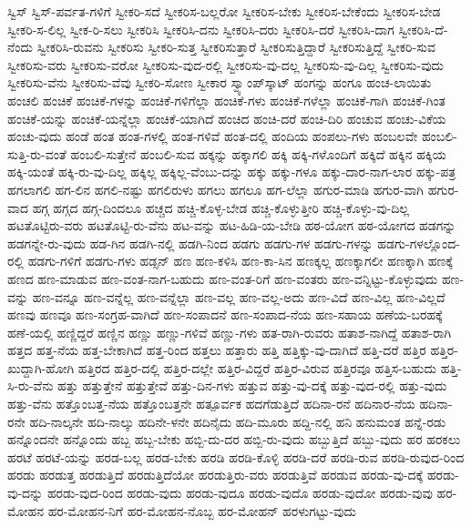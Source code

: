 {ಸ್ವಿಸ್
ಸ್ವಿಸ್‌-ಪರ್ವತ-ಗಳಿಗೆ
ಸ್ವೀಕರಿ-ಸದೆ
ಸ್ವೀಕರಿಸ-ಬಲ್ಲರೋ
ಸ್ವೀಕರಿಸ-ಬೇಕು
ಸ್ವೀಕರಿಸ-ಬೇಕೆಂದು
ಸ್ವೀಕರಿಸ-ಬೇಡ
ಸ್ವೀಕರಿ-ಸ-ಲಿಲ್ಲ
ಸ್ವೀಕ-ರಿ-ಸಲು
ಸ್ವೀಕರಿಸಿ
ಸ್ವೀಕರಿಸಿ-ದನು
ಸ್ವೀಕರಿಸಿ-ದರು
ಸ್ವೀಕರಿಸಿ-ದರೆ
ಸ್ವೀಕರಿಸಿ-ದಾಗ
ಸ್ವೀಕರಿಸಿ-ದೆ-ನೆಂದು
ಸ್ವೀಕರಿಸಿ-ರುವನು
ಸ್ವೀಕರಿಸು
ಸ್ವೀಕರಿ-ಸುತ್ತ
ಸ್ವೀಕರಿಸುತ್ತಾರೆ
ಸ್ವೀಕರಿಸುತ್ತಿದ್ದಾರೆ
ಸ್ವೀಕರಿಸುತ್ತಿದ್ದೆ
ಸ್ವೀಕರಿ-ಸುವ
ಸ್ವೀಕರಿಸು-ವರು
ಸ್ವೀಕರಿಸು-ವರೋ
ಸ್ವೀಕರಿಸು-ವುದ-ರಲ್ಲಿ
ಸ್ವೀಕರಿಸು-ವು-ದಲ್ಲ
ಸ್ವೀಕರಿಸು-ವು-ದಿಲ್ಲ
ಸ್ವೀಕರಿಸು-ವುದು
ಸ್ವೀಕರಿಸು-ವೆನು
ಸ್ವೀಕರಿಸು-ವೆವು
ಸ್ವೀಕರಿ-ಸೋಣ
ಸ್ವೀಕಾರ
ಸ್ವ್ಯಾಂಪ್‌ಸ್ಕಾಟ್
ಹಂಗನ್ನು
ಹಂಗೂ
ಹಂಚ-ಲಾಯಿತು
ಹಂಚಲಿ
ಹಂಚಿಕೆ
ಹಂಚಿಕೆ-ಗಳನ್ನು
ಹಂಚಿಕೆ-ಗಳಿಗೆಲ್ಲಾ
ಹಂಚಿಕೆ-ಗಳು
ಹಂಚಿಕೆ-ಗಳೆಲ್ಲಾ
ಹಂಚಿಕೆ-ಗಾಗಿ
ಹಂಚಿಕೆ-ಗಿಂತ
ಹಂಚಿಕೆ-ಯನ್ನು
ಹಂಚಿಕೆ-ಯನ್ನೆಲ್ಲಾ
ಹಂಚಿಕೆ-ಯಾಗಿದೆ
ಹಂಚಿದ
ಹಂಚಿ-ದರೆ
ಹಂಚಿ-ದಿರಿ
ಹಂಚುವ
ಹಂಚು-ವಿಕೆಯ
ಹಂಚು-ವುದು
ಹಂಡೆ
ಹಂತ
ಹಂತ-ಗಳಲ್ಲಿ
ಹಂತ-ಗಳಿವೆ
ಹಂತ-ದಲ್ಲಿ
ಹಂದಿಯ
ಹಂಪಲು-ಗಳು
ಹಂಬಲವೇ
ಹಂಬಲಿ-ಸುತ್ತಿ-ರು-ವಂತೆ
ಹಂಬಲಿ-ಸುತ್ತೇನೆ
ಹಂಬಲಿ-ಸುವ
ಹಕ್ಕನ್ನು
ಹಕ್ಕಾಗಲಿ
ಹಕ್ಕಿ
ಹಕ್ಕಿ-ಗಳೊಂದಿಗೆ
ಹಕ್ಕಿದೆ
ಹಕ್ಕಿನ
ಹಕ್ಕಿಯ
ಹಕ್ಕಿ-ಯಂತೆ
ಹಕ್ಕಿ-ರು-ವು-ದಿಲ್ಲ
ಹಕ್ಕಿಲ್ಲ
ಹಕ್ಕಿಲ್ಲ-ವೆಂಬು-ದನ್ನು
ಹಕ್ಕು
ಹಕ್ಕು-ಗಳೂ
ಹಕ್ಕು-ದಾರ-ನಾಗ-ಲಾರ
ಹಕ್ಕು-ಪತ್ರ
ಹಗಲಾಗಲಿ
ಹಗ-ಲಿನ
ಹಗಲಿ-ನಷ್ಟು
ಹಗಲಿರುಳು
ಹಗಲು
ಹಗಲೂ
ಹಗ-ಲೆಲ್ಲಾ
ಹಗುರ-ಮಾಡಿ
ಹಗುರ-ವಾಗಿ
ಹಗುರ-ವಾದ
ಹಗ್ಗ
ಹಗ್ಗದ
ಹಗ್ಗ-ದಿಂದಲೂ
ಹಚ್ಚದ
ಹಚ್ಚಿ-ಕೊಳ್ಳ-ಬೇಡ
ಹಚ್ಚಿ-ಕೊಳ್ಳುತ್ತೀರಿ
ಹಚ್ಚಿ-ಕೊಳ್ಳು-ವು-ದಿಲ್ಲ
ಹಟತೊಟ್ಟಿರು-ವರು
ಹಟತೊಟ್ಟಿ-ರು-ವೆನು
ಹಟ-ವನ್ನು
ಹಟ-ಹಿಡಿ-ಯ-ಬೇಡಿ
ಹಠ-ಯೋಗ
ಹಠ-ಯೋಗದ
ಹಡಗನ್ನು
ಹಡಗನ್ನೇ-ರು-ವುದು
ಹಡ-ಗಿನ
ಹಡಗಿ-ನಲ್ಲಿ
ಹಡಗಿ-ನಿಂದ
ಹಡಗು
ಹಡಗು-ಗಳ
ಹಡಗು-ಗಳನ್ನು
ಹಡಗು-ಗಳಲ್ಲೊಂದ-ರಲ್ಲಿ
ಹಡಗು-ಗಳಿಗೆ
ಹಡಗು-ಗಳು
ಹಡ್ಸನ್
ಹಣ
ಹಣ-ಕಳಿಸಿ
ಹಣ-ಕಾ-ಸಿನ
ಹಣಕ್ಕಲ್ಲ
ಹಣಕ್ಕಾಗಲೀ
ಹಣಕ್ಕಾಗಿ
ಹಣಕ್ಕೆ
ಹಣದ
ಹಣ-ಮಾಡುವ
ಹಣ-ವಂತ-ನಾಗ-ಬಹುದು
ಹಣ-ವಂತ-ರಿಗೆ
ಹಣ-ವಂತರು
ಹಣ-ವನ್ನಿಟ್ಟು-ಕೊಳ್ಳುವುದು
ಹಣ-ವನ್ನು
ಹಣ-ವನ್ನೂ
ಹಣ-ವನ್ನೆಲ್ಲ
ಹಣ-ವನ್ನೆಲ್ಲಾ
ಹಣ-ವಲ್ಲ
ಹಣ-ವಲ್ಲ-ಅದು
ಹಣ-ವಿದೆ
ಹಣ-ವಿಲ್ಲ
ಹಣ-ವಿಲ್ಲದೆ
ಹಣವು
ಹಣವೂ
ಹಣ-ಸಂಗ್ರಹ-ವಾಗಿದೆ
ಹಣ-ಸಂಪಾದನೆ
ಹಣ-ಸಂಪಾದ-ನೆಯ
ಹಣ-ಸಹಾಯ
ಹಣೆಯ-ಬರಹಕ್ಕೆ
ಹಣೆ-ಯಲ್ಲಿ
ಹಣ್ಣಿದ್ದರೆ
ಹಣ್ಣಿನ
ಹಣ್ಣು
ಹಣ್ಣು-ಗಳಿವೆ
ಹಣ್ಣು-ಗಳು
ಹತ-ರಾಗಿ-ರುವರು
ಹತಾಶ-ನಾಗಿದ್ದೆ
ಹತಾಶ-ರಾಗಿ
ಹತ್ತದ
ಹತ್ತ-ನೆಯ
ಹತ್ತ-ಬೇಕಾಗಿದೆ
ಹತ್ತ-ರಿಂದ
ಹತ್ತಲು
ಹತ್ತಾರು
ಹತ್ತಿ
ಹತ್ತಿಕ್ಕು-ವು-ದಾಗಿದೆ
ಹತ್ತಿ-ದರೆ
ಹತ್ತಿರ
ಹತ್ತಿರ-ಖುದ್ದಾಗಿ-ಹೋಗಿ
ಹತ್ತಿರದ
ಹತ್ತಿರ-ದಲ್ಲಿ
ಹತ್ತಿರ-ದಲ್ಲೇ
ಹತ್ತಿರ-ವಿದ್ದರೆ
ಹತ್ತಿರ-ವಿರುವ
ಹತ್ತಿರವೂ
ಹತ್ತಿಸ-ಬಹುದು
ಹತ್ತಿ-ಸಿ-ರು-ವೆನು
ಹತ್ತು
ಹತ್ತುತ್ತೇನೆ
ಹತ್ತುತ್ತೇವೆ
ಹತ್ತು-ದಿನ-ಗಳು
ಹತ್ತುವ
ಹತ್ತು-ವು-ದಕ್ಕೆ
ಹತ್ತು-ವುದ-ರಲ್ಲಿ
ಹತ್ತು-ವುದು
ಹತ್ತು-ವೆನು
ಹತ್ತೊಂಬತ್ತ-ನೆಯ
ಹತ್ತೊಂಬತ್ತನೇ
ಹತ್ಪೂರ್ವಕ
ಹದಗೆಡುತ್ತಿದೆ
ಹದಿನಾ-ರನೆ
ಹದಿನಾರ-ನೆಯ
ಹದಿನಾ-ರನೇ
ಹದಿ-ನಾಲ್ಕನೇ
ಹದಿ-ನಾಲ್ಕು
ಹದಿನೇ-ಳನೇ
ಹದಿನೈದು
ಹದಿ-ಮೂರು
ಹದ್ದಿ-ನಲ್ಲಿ
ಹನಿ
ಹನುಮಂತ
ಹನ್ನೆ-ರಡು
ಹನ್ನೊಂದನೇ
ಹನ್ನೊಂದು
ಹಬ್ಬ
ಹಬ್ಬ-ಬೇಕು
ಹಬ್ಬಿ-ದು-ದರ
ಹಬ್ಬಿ-ರು-ವುದು
ಹಬ್ಬುತ್ತಿದೆ
ಹಬ್ಬು-ವುದು
ಹರ
ಹರಕಲು
ಹರಟೆ
ಹರಟೆ-ಯನ್ನು
ಹರಡ-ಬಲ್ಲ
ಹರಡ-ಬೇಕು
ಹರಡಿ
ಹರಡಿ-ಕೊಳ್ಳಿ
ಹರಡಿ-ದರೆ
ಹರಡಿ-ರುವ
ಹರಡಿ-ರುವುದ-ರಿಂದ
ಹರಡು
ಹರಡುತ್ತ
ಹರಡುತ್ತಿದೆ
ಹರಡುತ್ತಿದೆಯೋ
ಹರಡುತ್ತಿರು-ವರು
ಹರಡುತ್ತಿವೆ
ಹರಡುವ
ಹರಡು-ವು-ದಕ್ಕೆ
ಹರಡು-ವು-ದನ್ನು
ಹರಡು-ವುದ-ರಿಂದ
ಹರಡು-ವುದು
ಹರಡು-ವುದೂ
ಹರಡು-ವುದೊ
ಹರಡು-ವುದೋ
ಹರಡು-ವುವು
ಹರ-ಮೋಹನ
ಹರ-ಮೋಹನ-ನಿಗೆ
ಹರ-ಮೋಹನ-ನೊಬ್ಬ
ಹರ-ಮೋಹನ್
ಹರಳುಗಟ್ಟು-ವುದು
}
